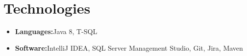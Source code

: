 \documentclass[letterpaper,11pt]{article}
\newcommand{\resumeSubHeadingListStart}{\begin{itemize}[leftmargin=*]}
\newcommand{\resumeSubHeadingListEnd}{\end{itemize}}
\begin{document}
	
	
	\section{Technologies}
	\resumeSubHeadingListStart
	\item{
		\textbf{Languages:}{\hfill Java 8, T-SQL}	
		\vspace{-5pt}	
	}
	\item{
		\textbf{Software:}{\hfill IntelliJ IDEA, SQL Server Management Studio, Git, Jira, Maven}
		\vspace{-5pt}		
	}
	
%
	
	\resumeSubHeadingListEnd
	
	
\end{document}
